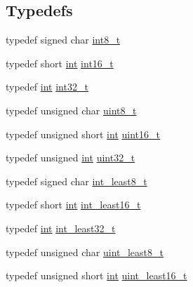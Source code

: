 \subsection*{Typedefs}
\begin{DoxyCompactItemize}
\item 
typedef signed char \hyperlink{win_2_l_a_d_s_p_a__plugins-win_2glibc__includes_2stdint_8h_aef44329758059c91c76d334e8fc09700}{int8\+\_\+t}
\item 
typedef short \hyperlink{xmltok_8h_a5a0d4a5641ce434f1d23533f2b2e6653}{int} \hyperlink{win_2_l_a_d_s_p_a__plugins-win_2glibc__includes_2stdint_8h_a66634143db08bebe9b46ab4cb1fc6fd3}{int16\+\_\+t}
\item 
typedef \hyperlink{xmltok_8h_a5a0d4a5641ce434f1d23533f2b2e6653}{int} \hyperlink{win_2_l_a_d_s_p_a__plugins-win_2glibc__includes_2stdint_8h_a32f2e37ee053cf2ce8ca28d1f74630e5}{int32\+\_\+t}
\item 
typedef unsigned char \hyperlink{win_2_l_a_d_s_p_a__plugins-win_2glibc__includes_2stdint_8h_aba7bc1797add20fe3efdf37ced1182c5}{uint8\+\_\+t}
\item 
typedef unsigned short \hyperlink{xmltok_8h_a5a0d4a5641ce434f1d23533f2b2e6653}{int} \hyperlink{win_2_l_a_d_s_p_a__plugins-win_2glibc__includes_2stdint_8h_adf4d876453337156dde61095e1f20223}{uint16\+\_\+t}
\item 
typedef unsigned \hyperlink{xmltok_8h_a5a0d4a5641ce434f1d23533f2b2e6653}{int} \hyperlink{win_2_l_a_d_s_p_a__plugins-win_2glibc__includes_2stdint_8h_a435d1572bf3f880d55459d9805097f62}{uint32\+\_\+t}
\item 
typedef signed char \hyperlink{win_2_l_a_d_s_p_a__plugins-win_2glibc__includes_2stdint_8h_ae04fa5ea5ad475bfe428842a986fbf28}{int\+\_\+least8\+\_\+t}
\item 
typedef short \hyperlink{xmltok_8h_a5a0d4a5641ce434f1d23533f2b2e6653}{int} \hyperlink{win_2_l_a_d_s_p_a__plugins-win_2glibc__includes_2stdint_8h_a3379485af1661b4f36ac1c311832253b}{int\+\_\+least16\+\_\+t}
\item 
typedef \hyperlink{xmltok_8h_a5a0d4a5641ce434f1d23533f2b2e6653}{int} \hyperlink{win_2_l_a_d_s_p_a__plugins-win_2glibc__includes_2stdint_8h_a647e80cea1327d7b1ccf0b2e1ebb1b53}{int\+\_\+least32\+\_\+t}
\item 
typedef unsigned char \hyperlink{win_2_l_a_d_s_p_a__plugins-win_2glibc__includes_2stdint_8h_ab0fdd2a9dc9606590ecccc0a5d8b5b7c}{uint\+\_\+least8\+\_\+t}
\item 
typedef unsigned short \hyperlink{xmltok_8h_a5a0d4a5641ce434f1d23533f2b2e6653}{int} \hyperlink{win_2_l_a_d_s_p_a__plugins-win_2glibc__includes_2stdint_8h_a1bae72af13d35bac8eb9424db7e27bf1}{uint\+\_\+least16\+\_\+t}

\end{DoxyCompactItemize}
